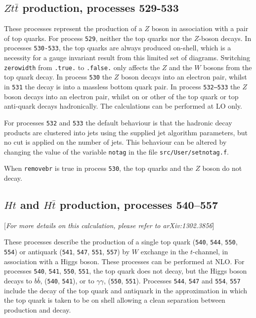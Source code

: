 \documentclass{article}
\begin{document}
{{{{{{\subsection{$Zt{\bar t}$ production, processes 529-533}
\label{subsec:ztt}

These processes represent the production of a $Z$ boson in association
with a pair of top quarks.
For process {\tt 529}, neither the top quarks nor the $Z$-boson
decays. 
In processes {\tt 530-533}, the top quarks are always
produced on-shell, which is a necessity for a gauge invariant result
from this limited set of diagrams.
Switching {\tt zerowidth} from {\tt .true.} to {\tt .false.} only affects
the $Z$ and the $W$ bosons from the top quark decay.
In process {\tt 530} the $Z$ boson decays into an electron pair, whilst
in {\tt 531} the decay is into a massless bottom quark pair.
In process {\tt 532--533} the $Z$ boson decays into an electron pair, whilst
on or other of the top quark or top anti-quark decays hadronically.
The calculations can be performed at LO only.

For processes {\tt 532} and {\tt 533} the default behaviour is that the hadronic decay products
are clustered into jets using the supplied jet
algorithm parameters, but no cut is applied on the number of jets.
This behaviour can be altered by changing the value of the
variable {\tt notag} in the file {\tt src/User/setnotag.f}.

When {\tt removebr} is true in process {\tt 530}, the top quarks and the $Z$ boson do not decay.

\subsection{$Ht$ and $H\bar{t}$ production, processes 540--557}
[{\it For more details on this calculation, please refer to arXiv:1302.3856}]

\label{subsec:Ht}
These processes describe the production of a single top quark ({\tt 540}, {\tt 544}, {\tt 550},
{\tt 554}) or antiquark ({\tt 541}, {\tt 547}, {\tt 551}, {\tt 557}) by $W$ exchange in the
$t$-channel, in association with a Higgs boson. These processes can be performed at NLO.
For processes {\tt 540}, {\tt 541}, {\tt 550},
{\tt 551}, the top quark does not decay, but the
Higgs boson decays to $b\bar{b}$, ({\tt 540}, {\tt 541}), or to $\gamma \gamma$, ({\tt 550}, {\tt 551}).
Processes {\tt 544}, {\tt 547} and {\tt 554}, {\tt 557} include the decay of the top quark and antiquark
in the approximation in which the top quark is taken to be on shell allowing a clean separation
between production and decay. 

}}}}}}
\end{document}
